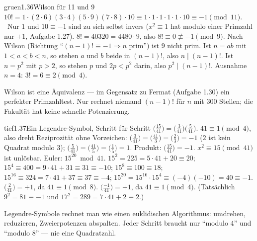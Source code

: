 \begin{loesungkarte}{gruen}{1.36}{Wilson für 11 und 9}
$10! = 1\cdot(2\cdot6)(3\cdot4)(5\cdot9)(7\cdot8)\cdot10\equiv1\cdot1\cdot1\cdot1\cdot1\cdot10\equiv-1\pmod{11}$. \checkmark\ Nur $1$ und $10\equiv-1$ sind zu sich selbst invers ($x^{2}\equiv1$ hat modulo einer Primzahl nur $\pm1$, Aufgabe 1.27).
$8! = 40320 = 4480\cdot9$, also $8!\equiv0\not\equiv-1\pmod9$. Nach Wilson (Richtung \enquote{$(n - 1)!\equiv-1\Rightarrow n$ prim}) ist $9$ nicht prim.
Ist $n = ab$ mit $1 < a < b < n$, so stehen $a$ und $b$ beide in $(n - 1)!$, also $n\mid(n - 1)!$. Ist $n = p^{2}$ mit $p > 2$, so stehen $p$ und $2p < p^{2}$ darin, also $p^{2}\mid(n - 1)!$. Ausnahme $n = 4$: $3! = 6\equiv2\pmod4$.
\begin{mitnehmen}\kastentext
Wilson ist eine Äquivalenz --- im Gegensatz zu Fermat (Aufgabe 1.30) ein perfekter Primzahltest. Nur rechnet niemand $(n - 1)!$ für $n$ mit $300$ Stellen; die Fakultät hat keine schnelle Potenzierung.
\end{mitnehmen}
\end{loesungkarte}

\begin{loesungkarte}{tief}{1.37}{Ein Legendre-Symbol, Schritt für Schritt}
$\bigl(\frac{15}{41}\bigr) = \bigl(\frac3{41}\bigr)\bigl(\frac5{41}\bigr)$. $41\equiv1\pmod4$, also dreht Reziprozität ohne Vorzeichen: $\bigl(\frac3{41}\bigr) = \bigl(\frac{41}3\bigr) = \bigl(\frac23\bigr) = -1$ ($2$ ist kein Quadrat modulo $3$); $\bigl(\frac5{41}\bigr) = \bigl(\frac{41}5\bigr) = \bigl(\frac15\bigr) = 1$. Produkt: $\bigl(\frac{15}{41}\bigr) = -1$. $x^{2}\equiv15\pmod{41}$ ist unlösbar.
Euler: $15^{20}\bmod41$. $15^{2} = 225 = 5\cdot41 + 20\equiv20$; $15^{4}\equiv400 = 9\cdot41 + 31\equiv31\equiv-10$; $15^{8}\equiv100\equiv18$; $15^{16}\equiv324 = 7\cdot41 + 37\equiv37\equiv-4$; $15^{20} = 15^{16}\cdot15^{4}\equiv(-4)(-10) = 40\equiv-1$. \checkmark
{}
$\bigl(\frac2{41}\bigr) = +1$, da $41\equiv1\pmod8$. $\bigl(\frac{-1}{41}\bigr) = +1$, da $41\equiv1\pmod4$. (Tatsächlich $9^{2} = 81\equiv-1$ und $17^{2} = 289 = 7\cdot41 + 2\equiv2$.)
\begin{mitnehmen}\kastentext
Legendre-Symbole rechnet man wie einen euklidischen Algorithmus: umdrehen, reduzieren, Zweierpotenzen abspalten. Jeder Schritt braucht nur \enquote{modulo $4$} und \enquote{modulo $8$} --- nie eine Quadratzahl.
\end{mitnehmen}
\end{loesungkarte}

